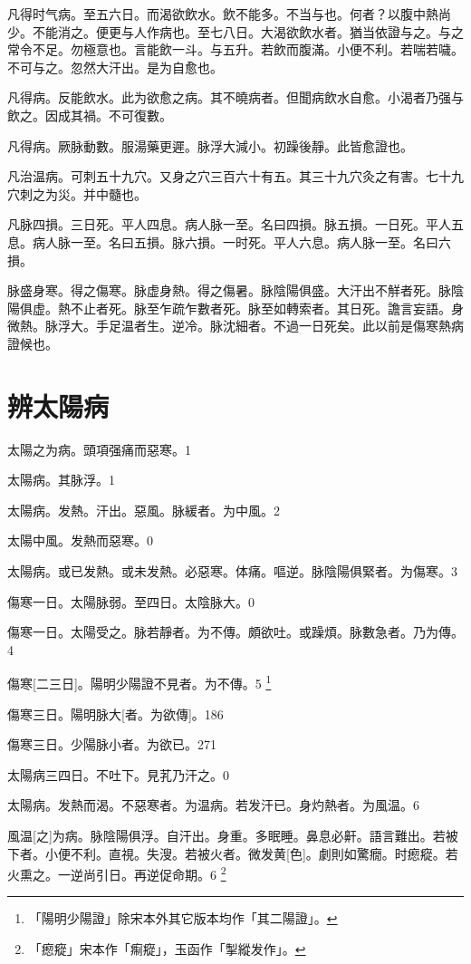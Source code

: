 \documentclass[12pt,oneside,UTF8,b5paper]{ctexbook}她她她她她她她
\begin{document}
凡得时气病。至五六日。而渴欲飲水。飲不能多。不当与也。何者？以腹中熱尚少。不能消之。便更与人作病也。至七八日。大渴欲飲水者。猶当依證与之。与之常令不足。勿極意也。言能飲一斗。与五升。若飲而腹滿。小便不利。若喘若噦。不可与之。忽然大汗出。是为自愈也。

凡得病。反能飲水。此为欲愈之病。其不曉病者。但聞病飲水自愈。小渴者乃强与飲之。因成其禍。不可復數。

凡得病。厥脉動數。服湯藥更遲。脉浮大減小。初躁後靜。此皆愈證也。

凡治温病。可刺五十九穴。又身之穴三百六十有五。其三十九穴灸之有害。七十九穴刺之为災。并中髓也。

凡脉四損。三日死。平人四息。病人脉一至。名曰四損。脉五損。一日死。平人五息。病人脉一至。名曰五損。脉六損。一时死。平人六息。病人脉一至。名曰六損。

脉盛身寒。得之傷寒。脉虚身熱。得之傷暑。脉陰陽俱盛。大汗出不觧者死。脉陰陽俱虚。熱不止者死。脉至乍疏乍數者死。脉至如轉索者。其日死。譫言妄語。身微熱。脉浮大。手足温者生。逆冷。脉沈細者。不過一日死矣。此以前是傷寒熱病證候也。

\chapter{辨太陽病}

太陽之为病。頭項强痛而惡寒。1

太陽病。其脉浮。1

太陽病。发熱。汗出。惡風。脉緩者。为中風。2

太陽中風。发熱而惡寒。0

太陽病。或已发熱。或未发熱。必惡寒。体痛。嘔逆。脉陰陽俱緊者。为傷寒。3

傷寒一日。太陽脉弱。至四日。太陰脉大。0

傷寒一日。太陽受之。脉若靜者。为不傳。頗欲吐。或躁煩。脉數急者。乃为傳。4

傷寒[二三日]。陽明少陽證不見者。为不傳。5
	\footnote{「陽明少陽證」除宋本外其它版本均作「其二陽證」。}

傷寒三日。陽明脉大[者。为欲傳]。186

傷寒三日。少陽脉小者。为欲已。271

太陽病三四日。不吐下。見芤乃汗之。0

太陽病。发熱而渴。不惡寒者。为温病。若发汗已。身灼熱者。为風温。6

風温[之]为病。脉陰陽俱浮。自汗出。身重。多眠睡。鼻息必鼾。語言難出。若被下者。小便不利。直視。失溲。若被火者。微发黄[色]。劇則如驚癇。时瘛瘲。若火熏之。一逆尚引日。再逆促命期。6
	\footnote{「瘛瘲」宋本作「痸瘲」，玉函作「掣縱发作」。}
\end{document}
